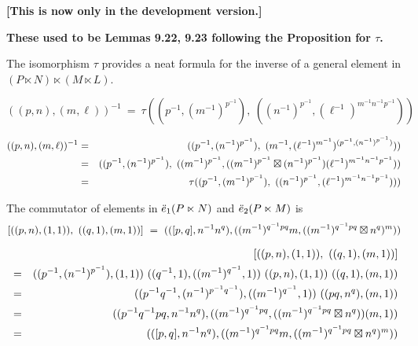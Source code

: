 
\newpage
\noindent
{\bf [This is now only in the development version.]}

\bigskip
\noindent
{\bf These used to be Lemmas 9.22, 9.23 following the Proposition for $\tau$.} 

\bigskip
The isomorphism $\tau$ provides a neat formula for the inverse of a 
general element in $(P \ltimes N) \ltimes (M \ltimes L)$.
\begin{lem}
$$
((p,n),(m,\ell))^{-1} ~=~ 
\tau((p^{-1},(m^{-1})^{p^{-1}}),~ 
 ((n^{-1})^{p^{-1}},(\ell^{-1})^{m^{-1}n^{-1}p^{-1}}))
$$
\end{lem}
\begin{pf}
\begin{eqnarray*}
((p,n),(m,\ell))^{-1} 
 &=& ((p^{-1},(n^{-1})^{p^{-1}}),~
        (m^{-1},(\ell^{-1})^{m^{-1}})^{(p^{-1},(n^{-1})^{p^{-1}})})) \\
 &=& ((p^{-1},(n^{-1})^{p^{-1}}),~
        ((m^{-1})^{p^{-1}},
          ((m^{-1})^{p^{-1}} \boxtimes (n^{-1})^{p^{-1}}) 
           (\ell^{-1})^{m^{-1}n^{-1}p^{-1}})) \\
 &=& \tau((p^{-1},(m^{-1})^{p^{-1}}),~ 
          ((n^{-1})^{p^{-1}},(\ell^{-1})^{m^{-1}n^{-1}p^{-1}}))) 
\end{eqnarray*}
\end{pf}

\begin{lem}
The commutator of elements in $\ddot{e}_1(P \ltimes N)$ 
and $\ddot{e}_2(P \ltimes M)$ is 
$$
 [((p,n),(1,1)),~((q,1),(m,1))]
~=~
 (([p,q],n^{-1}n^q), 
      ((m^{-1})^{q^{-1}pq}m,((m^{-1})^{q^{-1}pq}\boxtimes n^q)^m))
$$
\end{lem}
\begin{pf}
\vspace*{-8mm}
\begin{eqnarray*}
 & & [((p,n),(1,1)),~((q,1),(m,1))] \\
 &=& ((p^{-1},(n^{-1})^{p^{-1}}),(1,1))~
     ((q^{-1},1),((m^{-1})^{q^{-1}},1))~ 
     ((p,n),(1,1))~
     ((q,1),(m,1)) \\
 &=& ((p^{-1}q^{-1},(n^{-1})^{p^{-1}q^{-1}}),((m^{-1})^{q^{-1}},1))~ 
     ((pq,n^q),(m,1)) \\
 &=& ((p^{-1}q^{-1}pq,n^{-1}n^q), 
      ((m^{-1})^{q^{-1}pq},((m^{-1})^{q^{-1}pq}\boxtimes n^q))(m,1)) \\
 &=& (([p,q],n^{-1}n^q), 
      ((m^{-1})^{q^{-1}pq}m,((m^{-1})^{q^{-1}pq}\boxtimes n^q)^m)) 
\end{eqnarray*}
\end{pf}



